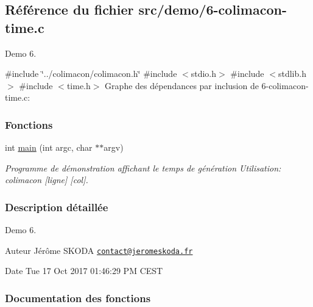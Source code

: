 \hypertarget{6-colimacon-time_8c}{}\subsection{Référence du fichier src/demo/6-\/colimacon-\/time.c}
\label{6-colimacon-time_8c}


Demo 6.  


{\ttfamily \#include \char`\"{}../colimacon/colimacon.\+h\char`\"{}}\newline
{\ttfamily \#include $<$stdio.\+h$>$}\newline
{\ttfamily \#include $<$stdlib.\+h$>$}\newline
{\ttfamily \#include $<$time.\+h$>$}\newline
Graphe des dépendances par inclusion de 6-\/colimacon-\/time.c\+:
\subsubsection*{Fonctions}
\begin{DoxyCompactItemize}
\item 
int \hyperlink{6-colimacon-time_8c_a3c04138a5bfe5d72780bb7e82a18e627}{main} (int argc, char $\ast$$\ast$argv)
\begin{DoxyCompactList}\small\item\em Programme de démonstration affichant le temps de génération Utilisation\+: colimacon \mbox{[}ligne\mbox{]} \mbox{[}col\mbox{]}. \end{DoxyCompactList}\end{DoxyCompactItemize}


\subsubsection{Description détaillée}
Demo 6. 

\begin{DoxyAuthor}{Auteur}
Jérôme S\+K\+O\+DA \href{mailto:contact@jeromeskoda.fr}{\tt contact@jeromeskoda.\+fr} 
\end{DoxyAuthor}
\begin{DoxyDate}{Date}
Tue 17 Oct 2017 01\+:46\+:29 PM C\+E\+ST 
\end{DoxyDate}


\subsubsection{Documentation des fonctions}
\mbox{\label{6-colimacon-time_8c_a3c04138a5bfe5d72780bb7e82a18e627}} 
